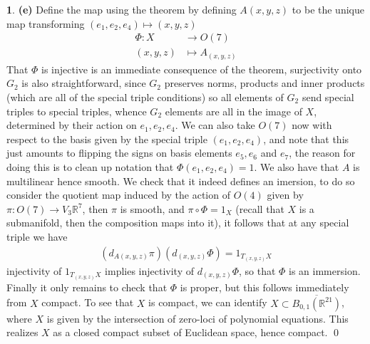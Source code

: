 \documentclass[10.5pt]{article}
\theoremstyle{definition}
\newtheorem{pb}{}
\begin{document}
\begin{pb}
        \textbf{(e)} Define the map using the theorem by defining \(A(x,y,z)\) to be the unique map transforming \((e_1,e_2,e_4) \mapsto (x,y,z)\)
        \begin{align*}
            \Phi: X &\to O(7) \\
            (x,y,z) &\mapsto A_{(x,y,z)}
        \end{align*}
        That \(\Phi\) is injective is an immediate consequence of the theorem, surjectivity onto \(G_2\) is also straightforward, since \(G_2\) preserves norms, products and inner products (which are all of the special triple conditions) so all elements of \(G_2\) send special triples to special triples, whence \(G_2\) elements are all in the image of \(X\), determined by their action on \(e_1,e_2,e_4\). We can also take \(O(7)\) now with respect to the basis given by the special triple \((e_1,e_2,e_4)\), and note that this just amounts to flipping the signs on basis elements \(e_5,e_6\) and \(e_7\), the reason for doing this is to clean up notation that \(\Phi(e_1,e_2,e_4) = 1\). We also have that \(A\) is multilinear hence smooth. We check that it indeed defines an imersion, to do so consider the quotient map induced by the action of \(O(4)\) given by \(\pi: O(7) \to V_3{\mathbb{R}^7}\), then \(\pi\) is smooth, and \(\pi\circ \Phi = 1_X\) (recall that \(X\) is a submanifold, then the composition maps into it), it follows that at any special triple we have
        \begin{align*}
            (d_{A(x,y,z)}\pi)(d_{(x,y,z)}\Phi) = 1_{T_{(x,y,z)}X}
        \end{align*}
        injectivity of \(1_{T_{(x,y,z)}X}\) implies injectivity of \(d_{(x,y,z)}\Phi\), so that \(\Phi\) is an immersion. Finally it only remains to check that \(\Phi\) is proper, but this follows immediately from \(X\) compact. To see that \(X\) is compact, we can identify \(X \subset \overline{B_{0,1}(\mathbb{R}^{21})}\), where \(X\) is given by the intersection of zero-loci of polynomial equations. This realizes \(X\) as a closed compact subset of Euclidean space, hence compact. \qed

    \end{pb}
\end{document}

